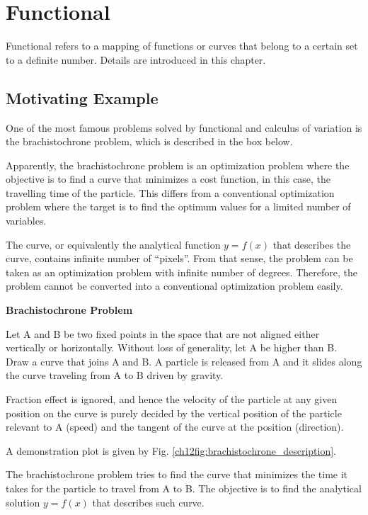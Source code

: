 \chapter{Functional}

Functional refers to a mapping of functions or curves that belong to a certain set to a definite number. Details are introduced in this chapter.

\section{Motivating Example}

One of the most famous problems solved by functional and calculus of variation is the brachistochrone problem, which is described in the box below.

Apparently, the brachistochrone problem is an optimization problem where the objective is to find a curve that minimizes a cost function, in this case, the travelling time of the particle. This differs from a conventional optimization problem where the target is to find the optimum values for a limited number of variables. 

The curve, or equivalently the analytical function $y=f(x)$ that describes the curve, contains infinite number of ``pixels''. From that sense, the problem can be taken as an optimization problem with infinite number of degrees. Therefore, the problem cannot be converted into a conventional optimization problem easily.

\begin{mdframed}
\noindent \textbf{Brachistochrone Problem}

Let A and B be two fixed points in the space that are not aligned either vertically or horizontally. Without loss of generality, let A be higher than B. Draw a curve that joins A and B. A particle is released from A and it slides along the curve traveling from A to B driven by gravity. 

Fraction effect is ignored, and hence the velocity of the particle at any given position on the curve is purely decided by the vertical position of the particle relevant to A (speed) and the tangent of the curve at the position (direction). 

A demonstration plot is given by Fig. \ref{ch12fig:brachistochrone_description}.

The brachistochrone problem tries to find the curve that minimizes the time it takes for the particle to travel from A to B. The objective is to find the analytical solution $y=f(x)$ that describes such curve.

\end{mdframed}

